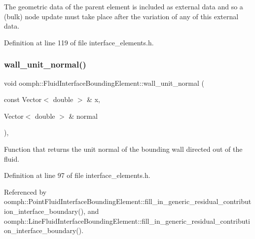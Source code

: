 The geometric data of the parent element is included as external data and so a (bulk) node update must take place after the variation of any of this external data. 



Definition at line 119 of file interface\+\_\+elements.\+h.

\mbox{\label{classoomph_1_1FluidInterfaceBoundingElement_a1a715427e2037278891c06afd5d096fb}} 
\subsubsection{\texorpdfstring{wall\+\_\+unit\+\_\+normal()}{wall\_unit\_normal()}}
{\footnotesize\ttfamily void oomph\+::\+Fluid\+Interface\+Bounding\+Element\+::wall\+\_\+unit\+\_\+normal (\begin{DoxyParamCaption}\item[{const Vector$<$ double $>$ \&}]{x,  }\item[{Vector$<$ double $>$ \&}]{normal }\end{DoxyParamCaption})\hspace{0.3cm}{\ttfamily [inline]}, {\ttfamily [protected]}}



Function that returns the unit normal of the bounding wall directed out of the fluid. 



Definition at line 97 of file interface\+\_\+elements.\+h.



Referenced by oomph\+::\+Point\+Fluid\+Interface\+Bounding\+Element\+::fill\+\_\+in\+\_\+generic\+\_\+residual\+\_\+contribution\+\_\+interface\+\_\+boundary(), and oomph\+::\+Line\+Fluid\+Interface\+Bounding\+Element\+::fill\+\_\+in\+\_\+generic\+\_\+residual\+\_\+contribution\+\_\+interface\+\_\+boundary().

\mbox{\label{classoomph_1_1FluidInterfaceBoundingElement_a3d8ea7b8e1f22eaaa1235231454b753c}} 

